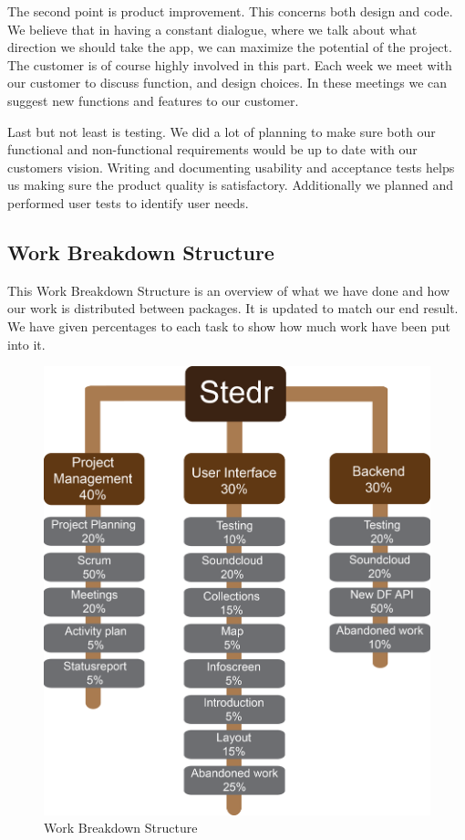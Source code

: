 The second point is product improvement. This concerns both design and code. We believe that in having a constant dialogue, where we talk about what direction we should take the app, we can maximize the potential of the project. The customer is of course highly involved in this part. Each week we meet with our customer to discuss function, and design choices. In these meetings we can suggest new functions and features to our customer.

Last but not least is testing. We did a lot of planning to make sure both our functional and non-functional requirements would be up to date with our customers vision. Writing and documenting usability and acceptance tests helps us making sure the product quality is satisfactory. Additionally we planned and performed user tests to identify user needs. 


\subsection{Work Breakdown Structure}
This Work Breakdown Structure is an overview of what we have done and how our work is distributed between packages. It is updated to match our end result.
We have given percentages to each task to show how much work have been put into it.

\begin{figure}[h!]
\begin{center}
\includegraphics[scale=0.6]{WBS}
\caption{Work Breakdown Structure}
\end{center}
\end{figure}
\clearpage




